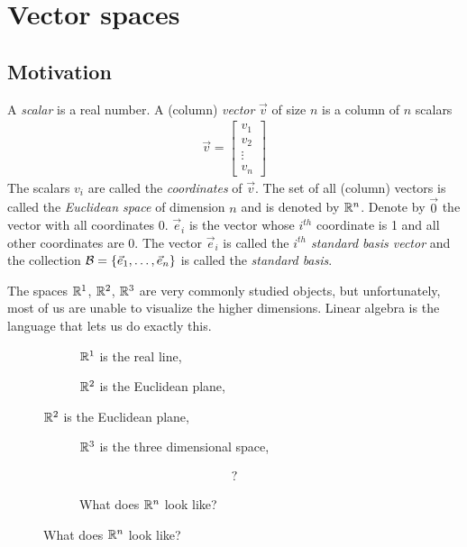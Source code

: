 
\section{Vector spaces}

\subsection{Motivation}
\label{section:VectorSpaces}
A \emph{scalar} is a real number.
A (column) \emph{vector} $\vec{v}$ of size $n$ is a column of $n$ scalars
\begin{align*}
  \vec{v} =
  \begin{bmatrix}
    v_1 \\
    v_2 \\
    \vdots \\
    v_n
  \end{bmatrix}
\end{align*}
The scalars $v_i$ are called the \textit{coordinates} of $\vec{v}$.
The set of all (column) vectors is called the \emph{Euclidean space} of dimension $n$ and is denoted by $\mathbb{R}^n$.
Denote by $\vec{0}$ the vector with all coordinates 0.
$\vec{e}_i$ is the vector whose $i^{th}$ coordinate is 1 and all other coordinates are 0.
The vector $\vec{e}_i$ is called the \emph{$i^{th}$ standard basis vector} and the collection $\mathcal{B}= \left\{\vec{e}_1, \dots, \vec{e}_n\right\}$ is called the \emph{standard basis}.

The spaces $\mathbb{R}^1$, $\mathbb{R}^2$, $\mathbb{R}^3$ are very commonly studied objects, but unfortunately, most of us are unable to visualize the higher dimensions.
Linear algebra is the language that lets us do exactly this.

\begin{figure}[H]
  \centering
  \begin{subfigure}[b]{0.45\textwidth}
    
    \caption*{$\mathbb{R}^1$ is the real line,}
  \end{subfigure}
  \hfill
  \begin{subfigure}[b]{0.45\textwidth}
    
    \caption*{$\mathbb{R}^2$ is the Euclidean plane,}
  \end{subfigure}
\end{figure}
\begin{figure}[H]
  \centering
  \begin{subfigure}[b]{0.45\textwidth}
    
    \caption*{$\mathbb{R}^3$ is the three dimensional space,}
  \end{subfigure}
  \hfill
  \begin{subfigure}[b]{0.45\textwidth}
    {\Huge \begin{align*}
      ?
    \end{align*}}
    \caption*{What does $\mathbb{R}^n$ look like?}
  \end{subfigure}
\end{figure}


